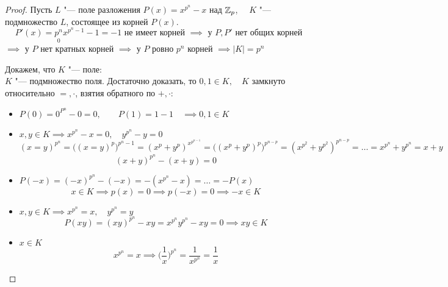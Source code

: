 \begin{proof}
	Пусть $ L $ "--- поле разложения $ P(x) = x^{p^n} - x $ над $ \mathbb{Z}_p $, $ \quad K $ "--- подмножество $ L $, состоящее из корней $ P(x) $.
	$$ P'(x) = \underset0{p^n}x^{p^n - 1} - 1 = -1 \text{ не имеет корней } \implies \text{ у } P, P' \text{ нет общих корней} $$
	$ \implies $ у $ P $ нет кратных корней $ \implies $ у $ P $ ровно $ p^n $ корней $ \implies |K| = p^n $

	Докажем, что $ K $ "--- поле: \\
	$ K $ "--- подмножество поля. Достаточно доказать, то $ 0, 1 \in K, \quad K $ замкнуто относительно $ =, \cdot $, взятия обратного по $ +, \cdot $:
	\begin{itemize}
		\item $ P(0) = 0^{P^n} - 0 = 0, \qquad P(1) = 1 - 1 \quad \implies 0, 1 \in K $
		\item $ x, y \in K \implies x^{p^n} - x = 0, \quad y^{p^n} - y = 0 $
		$$ (x = y)^{p^n} = \bigg( (x = y)^p \bigg)^{p^n - 1} = (x^p + y^p)^{x^{p^{n - 1}}} = \bigg( (x^p + y^p)^p \bigg)^{p^{n - p}} = (x^{p^2} + y^{p^2})^{p^{n - p}} = \dots = x^{p^n} + y^{p^n} = x + y $$
		$$ (x + y)^{p^n} - (x + y) = 0 $$
		\item $ P(-x) = (-x)^{p^n} - (-x) = -(x^{p^n} - x) = \dots = -P(x) $
		$$ x \in K \implies p(x) = 0 \implies p (-x) = 0 \implies -x \in K $$
		\item $ x, y \in K \implies x^{p^n} = x, \quad y^{p^n} = y $
		$$ P(xy) = (xy)^{p^n} - xy = x^{p^n}y^{p^n} - xy = 0 \implies xy \in K $$
		\item $ x \in K $
		$$ x^{p^n} = x \implies \bigg( \frac1x \bigg)^{p^n} = \frac1{x^{p^n}} = \frac1x $$
	\end{itemize}
\end{proof}
